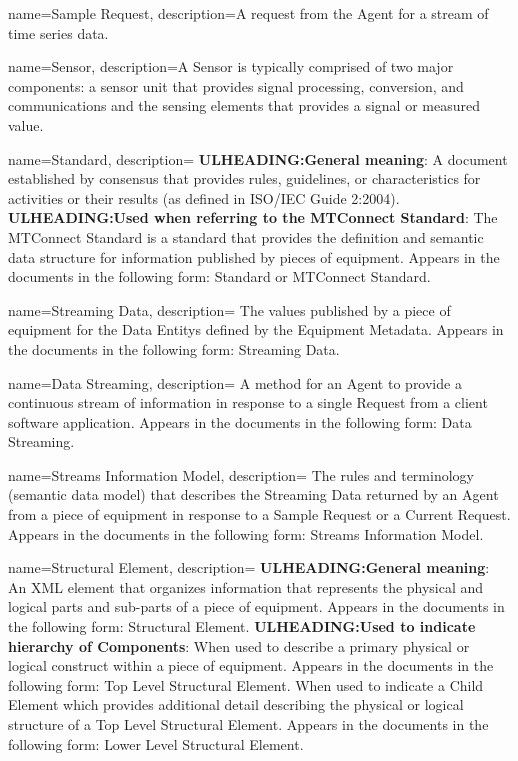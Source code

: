 {
    name={Sample Request},
	description={A request from the \gls{Agent} for a stream of time series data.}
}

{
    name={Sensor},
	description={A \gls{Sensor} is typically comprised of two major components: a \gls{sensor unit} that provides signal processing, conversion, and communications and the \glspl{sensing element} that provides a signal or measured value.}
}

{
    name={Standard},
	description={
	\textbf{ULHEADING:General meaning}:
	A document established by consensus that provides rules, guidelines, or characteristics for activities or their results (as defined in ISO/IEC Guide 2:2004).
	\textbf{ULHEADING:Used when referring to the MTConnect Standard}: 
	The MTConnect Standard is a standard that provides the definition and semantic data structure for information published by pieces of equipment.
	Appears in the documents in the following form: Standard or MTConnect Standard.
}
}

{
    name={Streaming Data},
	description={
	The values published by a piece of equipment for the \glspl{Data Entity} defined by the \gls{Equipment Metadata}.
	Appears in the documents in the following form: \gls{Streaming Data}.
}
}

{
    name={Data Streaming},
	description={
	A method for an \gls{Agent} to provide a continuous stream of information in response to a single \gls{Request} from a client software application.
	Appears in the documents in the following form: \gls{Data Streaming}.
}
}

{
    name={Streams Information Model},
	description={
	The rules and terminology (\gls{semantic data model}) that describes the \gls{Streaming Data} returned by an \gls{Agent} from a piece of equipment in response to a \gls{Sample Request} or a \gls{Current Request}.
	Appears in the documents in the following form: \gls{Streams Information Model}.
}
}

{
    name={Structural Element},
	description={
	\textbf{ULHEADING:General meaning}:
	An XML element that organizes information that represents the physical and logical parts and sub-parts of a piece of equipment.
	Appears in the documents in the following form: \gls{Structural Element}.
	\textbf{ULHEADING:Used to indicate hierarchy of Components}:
	When used to describe a primary physical or logical construct within a piece of equipment. 
	Appears in the documents in the following form: \gls{Top Level} \gls{Structural Element}.
	When used to indicate a \gls{Child Element} which provides additional detail describing the physical or logical structure of a \gls{Top Level} \gls{Structural Element}.
	Appears in the documents in the following form: \gls{Lower Level} \gls{Structural Element}.
}
}

